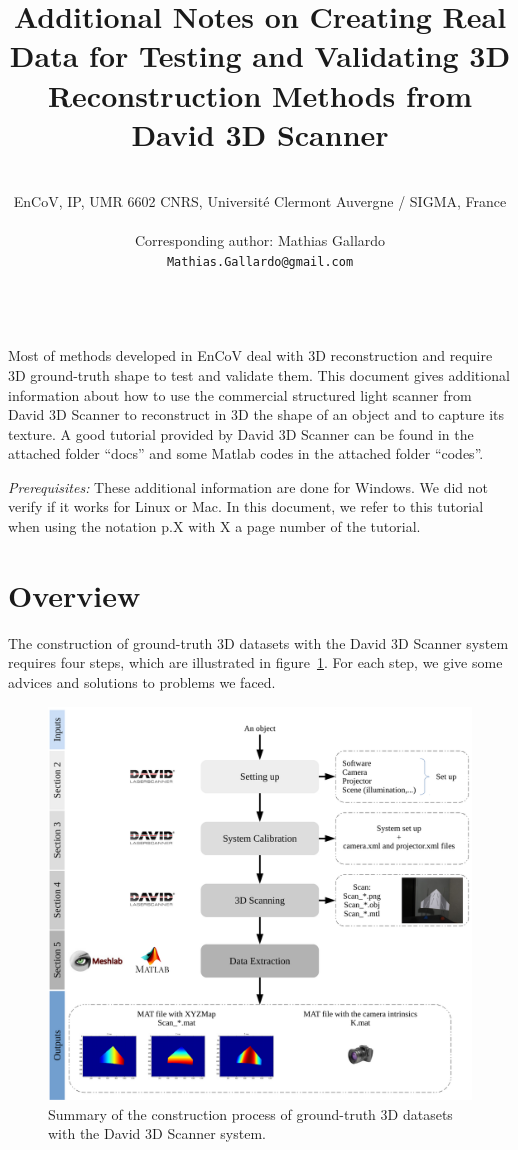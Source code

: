\documentclass[11pt]{article}
\title{Additional Notes on Creating Real Data for Testing and Validating 3D Reconstruction Methods from David 3D Scanner}
\author{
~\\
EnCoV, IP, UMR 6602 CNRS, Universit\'e Clermont Auvergne / SIGMA, France \\
~\\
Corresponding author: Mathias Gallardo\\
{\tt Mathias.Gallardo@gmail.com}\\
~\\
}
\begin{document}
\maketitle
\thispagestyle{empty}

Most of methods developed in EnCoV deal with 3D reconstruction and require 3D ground-truth shape to test and validate them.
This document gives additional information about how to use the commercial structured light scanner from David 3D Scanner to reconstruct in 3D the shape of an object and to capture its texture.
A good tutorial provided by David 3D Scanner can be found in the attached folder ``docs'' and some Matlab codes in the attached folder ``codes''.

\textit{Prerequisites:}
These additional information are done for Windows.
We did not verify if it works for Linux or Mac.
In this document, we refer to this tutorial when using the notation p.X with X a page number of the tutorial.

\newpage
\tableofcontents
\newpage

\section{Overview}
The construction of ground-truth 3D datasets with the David 3D Scanner system requires four steps, which are illustrated in figure~\ref{fig:overview}.
For each step, we give some advices and solutions to problems we faced.

 \begin{figure}[h]
 	\begin{center}
 		\includegraphics[width=15 cm]{images/overview.pdf}
 	\end{center}
 	\caption{Summary of the construction process of ground-truth 3D datasets with the David 3D Scanner system.}
 	\label{fig:overview}
 \end{figure}
\newpage
\end{document}
